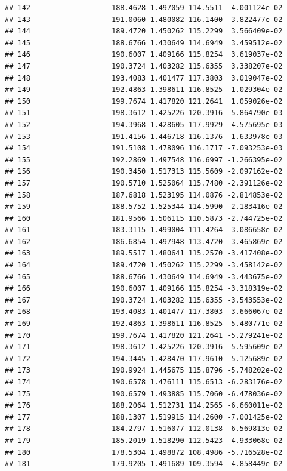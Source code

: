 \documentclass[
]{article}
\begin{document}
\begin{verbatim}
## 142                   188.4628 1.497059 114.5511  4.001124e-02
## 143                   191.0060 1.480082 116.1400  3.822477e-02
## 144                   189.4720 1.450262 115.2299  3.566409e-02
## 145                   188.6766 1.430649 114.6949  3.459512e-02
## 146                   190.6007 1.409166 115.8254  3.619037e-02
## 147                   190.3724 1.403282 115.6355  3.338207e-02
## 148                   193.4083 1.401477 117.3803  3.019047e-02
## 149                   192.4863 1.398611 116.8525  1.029304e-02
## 150                   199.7674 1.417820 121.2641  1.059026e-02
## 151                   198.3612 1.425226 120.3916  5.864790e-03
## 152                   194.3968 1.428605 117.9929  4.575695e-03
## 153                   191.4156 1.446718 116.1376 -1.633978e-03
## 154                   191.5108 1.478096 116.1717 -7.093253e-03
## 155                   192.2869 1.497548 116.6997 -1.266395e-02
## 156                   190.3450 1.517313 115.5609 -2.097162e-02
## 157                   190.5710 1.525064 115.7480 -2.391126e-02
## 158                   187.6818 1.523195 114.0876 -2.814853e-02
## 159                   188.5752 1.525344 114.5990 -2.183416e-02
## 160                   181.9566 1.506115 110.5873 -2.744725e-02
## 161                   183.3115 1.499004 111.4264 -3.086658e-02
## 162                   186.6854 1.497948 113.4720 -3.465869e-02
## 163                   189.5517 1.480641 115.2570 -3.417408e-02
## 164                   189.4720 1.450262 115.2299 -3.458142e-02
## 165                   188.6766 1.430649 114.6949 -3.443675e-02
## 166                   190.6007 1.409166 115.8254 -3.318319e-02
## 167                   190.3724 1.403282 115.6355 -3.543553e-02
## 168                   193.4083 1.401477 117.3803 -3.666067e-02
## 169                   192.4863 1.398611 116.8525 -5.480771e-02
## 170                   199.7674 1.417820 121.2641 -5.279241e-02
## 171                   198.3612 1.425226 120.3916 -5.595609e-02
## 172                   194.3445 1.428470 117.9610 -5.125689e-02
## 173                   190.9924 1.445675 115.8796 -5.748202e-02
## 174                   190.6578 1.476111 115.6513 -6.283176e-02
## 175                   190.6579 1.493885 115.7060 -6.478036e-02
## 176                   188.2064 1.512731 114.2565 -6.660011e-02
## 177                   188.1307 1.519915 114.2600 -7.001425e-02
## 178                   184.2797 1.516077 112.0138 -6.569813e-02
## 179                   185.2019 1.518290 112.5423 -4.933068e-02
## 180                   178.5304 1.498872 108.4986 -5.716528e-02
## 181                   179.9205 1.491689 109.3594 -4.858449e-02

\end{verbatim}
\end{document}
